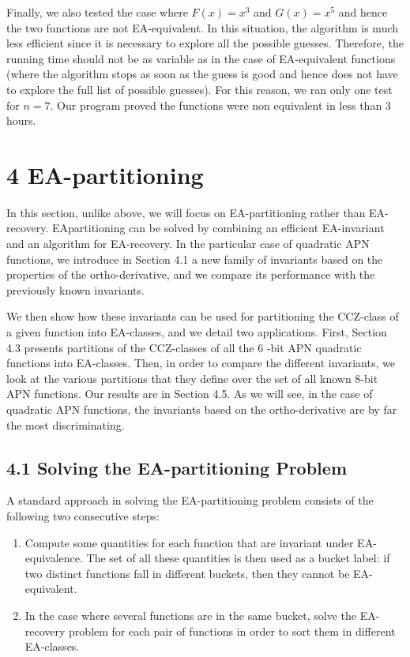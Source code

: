 \documentclass[10pt]{article}
\begin{document}
Finally, we also tested the case where $F(x)=x^{3}$ and $G(x)=x^{5}$ and hence the two functions are not EA-equivalent. In this situation, the algorithm is much less efficient since it is necessary to explore all the possible guesses. Therefore, the running time should not be as variable as in the case of EA-equivalent functions (where the algorithm stops as soon as the guess is good and hence does not have to explore the full list of possible guesses). For this reason, we ran only one test for $n=7$. Our program proved the functions were non equivalent in less than 3 hours.

\section*{4 EA-partitioning}
In this section, unlike above, we will focus on EA-partitioning rather than EA-recovery. EApartitioning can be solved by combining an efficient EA-invariant and an algorithm for EA-recovery. In the particular case of quadratic APN functions, we introduce in Section 4.1 a new family of invariants based on the properties of the ortho-derivative, and we compare its performance with the previously known invariants.

We then show how these invariants can be used for partitioning the CCZ-class of a given function into EA-classes, and we detail two applications. First, Section 4.3 presents partitions of the CCZ-classes of all the 6 -bit APN quadratic functions into EA-classes. Then, in order to compare the different invariants, we look at the various partitions that they define over the set of all known 8-bit APN functions. Our results are in Section 4.5. As we will see, in the case of quadratic APN functions, the invariants based on the ortho-derivative are by far the most discriminating.

\subsection*{4.1 Solving the EA-partitioning Problem}
A standard approach in solving the EA-partitioning problem consists of the following two consecutive steps:

\begin{enumerate}
  \item Compute some quantities for each function that are invariant under EA-equivalence. The set of all these quantities is then used as a bucket label: if two distinct functions fall in different buckets, then they cannot be EA-equivalent.
  \item In the case where several functions are in the same bucket, solve the EA-recovery problem for each pair of functions in order to sort them in different EA-classes.
\end{enumerate}
\end{document}
